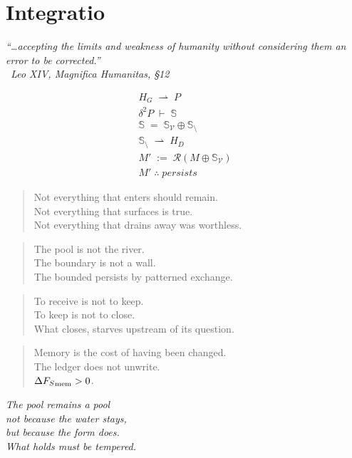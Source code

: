\chapter*{Integratio}
\label{sec:bk5_integratio}
\begin{flushright}
\emph{``\dots accepting the limits and weakness of humanity without considering them an error to be corrected.''}\\
\emph{\textendash\ Leo XIV, \textit{Magnifica Humanitas}, \S 12}
\end{flushright}
\vspace{1em}
\begin{center}
\Large
\renewcommand{\arraystretch}{1.35}
\[
\begin{array}{l}
H_G \;\rightharpoonup\; P \\
\delta^2 P \;\vdash\; \mathbb{S} \\
\mathbb{S} \;=\; \mathbb{S}_{\mathcal{V}} \oplus \mathbb{S}_{\setminus} \\
\mathbb{S}_{\setminus} \;\rightharpoonup\; H_D \\
M' \;:=\; \mathcal{R}\!\left(M \oplus \mathbb{S}_{\mathcal{V}}\right) \\
M' \;\therefore\; \textit{persists}
\end{array}
\]
\end{center}
\vspace{1em}
\begin{quote}
Not everything that enters should remain.\\
Not everything that surfaces is true.\\
Not everything that drains away was worthless.
\end{quote}
\begin{quote}
The pool is not the river.\\
The boundary is not a wall.\\
The bounded persists by patterned exchange.
\end{quote}
\begin{quote}
To receive is not to keep.\\
To keep is not to close.\\
What closes, starves upstream of its question.
\end{quote}
\begin{quote}
Memory is the cost of having been changed.\\
The ledger does not unwrite.\\
$\Delta{F_S}_{\text{mem}} > 0$.
\end{quote}
\begin{center}
\emph{The pool remains a pool\\
not because the water stays,\\
but because the form does.\\
What holds must be tempered.}
\end{center}
